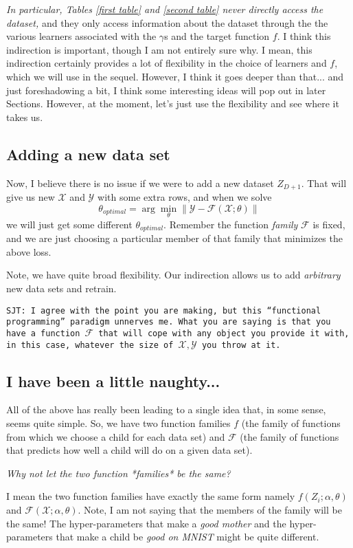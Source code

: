 \documentclass{article}
\begin{document}
\emph{In particular, Tables \ref{first table} and \ref{second table} never directly access the dataset,} and they only access information about the dataset through the the various learners associated with the $\gamma$s and the target function $f$.  I think this indirection is important, though I am not entirely sure why.  I mean, this indirection certainly provides a lot of flexibility in the choice of learners and $f$, which we will use in the sequel. However, I think it goes deeper than that... and just foreshadowing a bit, I think some interesting ideas will pop out in later Sections.  However, at the moment, let's just use the flexibility and see where it takes us.

\subsection{Adding a new data set}
Now, I believe there is no issue if we were to add a new dataset $Z_{D+1}$.  That will give us new $\mathcal{X}$ and $\mathcal{Y}$ with some extra rows, and when we solve 
$$
\theta_{optimal} = \arg \min_{\theta} \| \mathcal{Y} - \mathcal{F}(\mathcal{X};\theta)\|
$$
we will just get some different $\theta_{optimal}$.  Remember the function \emph{family} $\mathcal{F}$ is fixed, and we are just choosing a particular member of that family that minimizes the above loss.

Note, we have quite broad flexibility.  Our indirection allows us to add \emph{arbitrary} new data sets and retrain.

{\tt SJT: I agree with the point you are making, but this ``functional programming'' paradigm unnerves me. What you are saying is that you have a function $\mathcal{F}$ that will cope with any object you provide it with, in this case, whatever the size of $\mathcal{X}, \mathcal{Y}$ you throw at it.}


\subsection{I have been a little naughty...}
All of the above has really been leading to a single idea that, in some sense, seems quite simple. So, we have two function families $f$ (the family of functions from which we choose a child for each data set) and $\mathcal{F}$ (the family of functions that predicts how well a child will do on a given data set).

\emph{Why not let the two function *families* be the same?}

I mean the two function families have exactly the same form namely $f(Z_i;\alpha,\theta)$ and $\mathcal{F}(\mathcal{X};\alpha,\theta)$. Note, I am not saying that the members of the family will be the same!  The hyper-parameters that make a \emph{good mother} and the hyper-parameters that make a child be \emph{good on MNIST} might be quite different. 
\end{document}
